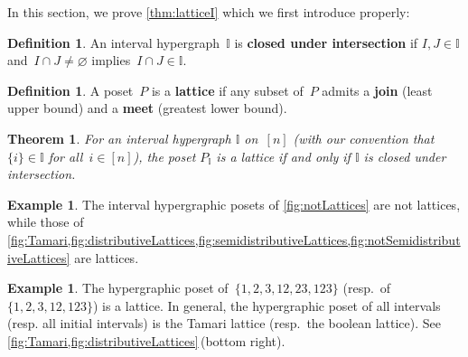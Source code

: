 \documentclass{amsart}
\newtheorem{theoremA}{Theorem}
\theoremstyle{definition}
\newtheorem{definition}[theorem]{Definition}
\newtheorem{example}[theorem]{Example}
\newcommand{\defn}[1]{\textbf{\textsf{\color{PineGreen} #1}}} %
\newcommand{\II}{\mathbb I} %
\begin{document}
In this section, we prove \cref{thm:latticeI} which we first introduce properly: %

\begin{definition}
\label{def:intersectionClosed}
An interval hypergraph~$\II$ is \defn{closed under intersection} if $I, J \in \II$ and~$I \cap J \ne \varnothing$ implies~$I \cap J \in \II$.
\end{definition}

\begin{definition}
A poset~$P$ is a \defn{lattice} if any subset of~$P$ admits a \defn{join} (least upper bound) and a \defn{meet} (greatest lower bound).
\end{definition}

\begin{theoremA}
For an interval hypergraph $\II$ on~$[n]$ (with our convention that~$\{i\} \in \II$ for all~$i \in [n]$), the poset $P_\II$ is a lattice if and only if $\II$ is closed under intersection.
\end{theoremA}

\begin{example}
The interval hypergraphic posets of \cref{fig:notLattices} are not lattices, while those of \cref{fig:Tamari,fig:distributiveLattices,fig:semidistributiveLattices,fig:notSemidistributiveLattices} are lattices.
\end{example}

\begin{example}
The hypergraphic poset of~$\{ 1, 2, 3, 12, 23, 123\}$ (resp.~of~$\{ 1, 2, 3, 12, 123\}$) is a lattice.
In general, the hypergraphic poset of all intervals (resp. all initial intervals) is the Tamari lattice (resp.~the boolean lattice).
See \cref{fig:Tamari,fig:distributiveLattices}\,(bottom right).
\end{example}
\end{document}
